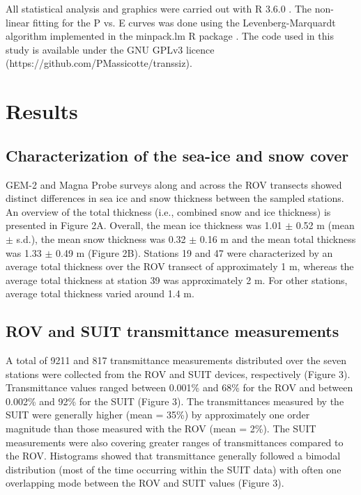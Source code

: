 \documentclass[draft]{agujournal2018}
\begin{document}
All statistical analysis and graphics were carried out with R 3.6.0 \citep{RCoreTeam2019}. The non-linear fitting for the P vs. E curves was done using the Levenberg-Marquardt algorithm implemented in the minpack.lm R package \citep{Elzhov2013}. The code used in this study is available under the GNU GPLv3 licence (https://github.com/PMassicotte/transsiz).

\section{Results}

\subsection{Characterization of the sea-ice and snow cover}

GEM-2 and Magna Probe surveys along and across the ROV transects showed distinct differences in sea ice and snow thickness between the sampled stations. An overview of the total thickness (i.e., combined snow and ice thickness) is presented in Figure 2A. Overall, the mean ice thickness was 1.01 $\pm$ 0.52 m (mean $\pm$ s.d.), the mean snow thickness was 0.32 $\pm$ 0.16 m and the mean total thickness was 1.33 $\pm$ 0.49 m (Figure 2B). Stations 19 and 47 were characterized by an average total thickness over the ROV transect of approximately 1 m, whereas the average total thickness at station 39 was approximately 2 m. For other stations, average total thickness varied around 1.4 m.

\subsection{ROV and SUIT transmittance measurements}

A total of 9211 and 817 transmittance measurements distributed over the seven stations were collected from the ROV and SUIT devices, respectively (Figure 3). Transmittance values ranged between 0.001\% and 68\% for the ROV and between 0.002\% and 92\% for the SUIT (Figure 3). The transmittances measured by the SUIT were generally higher (mean = 35\%) by approximately one order magnitude than those measured with the ROV (mean = 2\%). The SUIT measurements were also covering greater ranges of transmittances compared to the ROV. Histograms showed that transmittance generally followed a bimodal distribution (most of the time occurring within the SUIT data) with often one overlapping mode between the ROV and SUIT values (Figure 3). 
\end{document}
